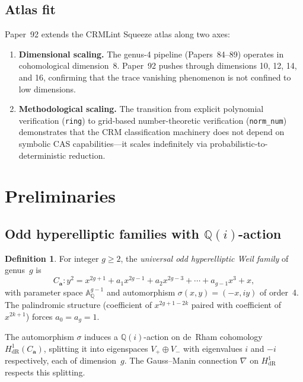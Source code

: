 \documentclass[11pt]{article}
\theoremstyle{plain}
\theoremstyle{definition}
\newtheorem{definition}[theorem]{Definition}
\theoremstyle{remark}
\newcommand{\QQ}{\mathbb{Q}}
\newcommand{\Aff}{\mathbb{A}}
\begin{document}
\subsection{Atlas fit}

Paper~92 extends the CRMLint Squeeze atlas along two axes:
\begin{enumerate}[nosep]
  \item \textbf{Dimensional scaling.}  The genus-4 pipeline (Papers~84--89)
    operates in cohomological dimension~8.  Paper~92 pushes through
    dimensions 10, 12, 14, and 16, confirming that the trace vanishing
    phenomenon is not confined to low dimensions.
  \item \textbf{Methodological scaling.}  The transition from explicit
    polynomial verification (\texttt{ring}) to grid-based number-theoretic
    verification (\texttt{norm\_num}) demonstrates that the CRM classification
    machinery does not depend on symbolic CAS capabilities---it scales
    indefinitely via probabilistic-to-deterministic reduction.
\end{enumerate}

\section{Preliminaries}

\subsection{Odd hyperelliptic families with \texorpdfstring{$\QQ(i)$}{Q(i)}-action}

\begin{definition}\label{def:universal-family}
For integer $g \geq 2$, the \emph{universal odd hyperelliptic Weil family} of
genus~$g$ is
\[
  C_{\mathbf{a}}: y^2 = x^{2g+1} + a_1 x^{2g-1} + a_2 x^{2g-3}
    + \cdots + a_{g-1} x^3 + x,
\]
with parameter space $\Aff^{g-1}_\QQ$ and automorphism
$\sigma(x,y) = (-x, iy)$ of order~4.  The palindromic structure
(coefficient of $x^{2g+1-2k}$ paired with coefficient of $x^{2k+1}$)
forces $a_0 = a_g = 1$.
\end{definition}

The automorphism $\sigma$ induces a $\QQ(i)$-action on de~Rham cohomology
$H^1_{\mathrm{dR}}(C_{\mathbf{a}})$, splitting it into eigenspaces
$V_+ \oplus V_-$ with eigenvalues $i$ and $-i$ respectively, each of
dimension~$g$.  The Gauss--Manin connection $\nabla$ on $H^1_{\mathrm{dR}}$
respects this splitting.
\end{document}
